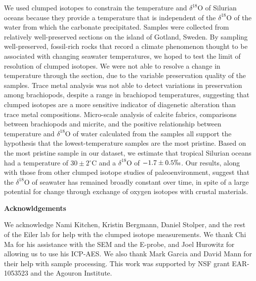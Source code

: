 \documentclass{article}
\newcommand{\deltao}{$\delta^{18}$}
\newcommand{\degrees}{$^{\circ}$}
\begin{document}
We used clumped isotopes to constrain the temperature and \deltao O of Silurian oceans because they provide a temperature that is independent of the \deltao O of the water from which the carbonate precipitated. Samples were collected from relatively well-preserved sections on the island of Gotland, Sweden. By sampling well-preserved, fossil-rich rocks that record a climate phenomenon thought to be associated with changing seawater temperatures, we hoped to test the limit of resolution of clumped isotopes. We were not able to resolve a change in temperature through the section, due to the variable preservation quality of the samples. Trace metal analysis was not able to detect variations in preservation among brachiopods, despite a range in brachiopod temperatures, suggesting that clumped isotopes are a more sensitive indicator of diagenetic alteration than trace metal compositions. Micro-scale analysis of calcite fabrics, comparisons between brachiopods and micrite, and the positive relationship between temperature and \deltao O of water calculated from the samples all support the hypothesis that the lowest-temperature samples are the most pristine. Based on the most pristine sample in our dataset, we estimate that tropical Silurian oceans had a temperature of  $30\pm 2$\degrees C and a \deltao O of $-1.7\pm 0.5\permil$. Our results, along with those from other clumped isotope studies of paleoenvironment, suggest that the \deltao O of seawater has remained broadly constant over time, in spite of a large potential for change through exchange of oxygen isotopes with crustal materials. 

\vspace{0.7cm} \noindent \large \textbf{Acknowldgements} \normalsize

We acknowledge Nami Kitchen, Kristin Bergmann, Daniel Stolper, and the rest of the Eiler lab for help with the clumped isotope measurements. We thank Chi Ma for his assistance with the SEM and the E-probe, and Joel Hurowitz for allowing us to use his ICP-AES. We also thank Mark Garcia and David Mann for their help with sample processing. This work was supported by NSF grant EAR-1053523 and the Agouron Institute. 

\newpage



\end{document}
